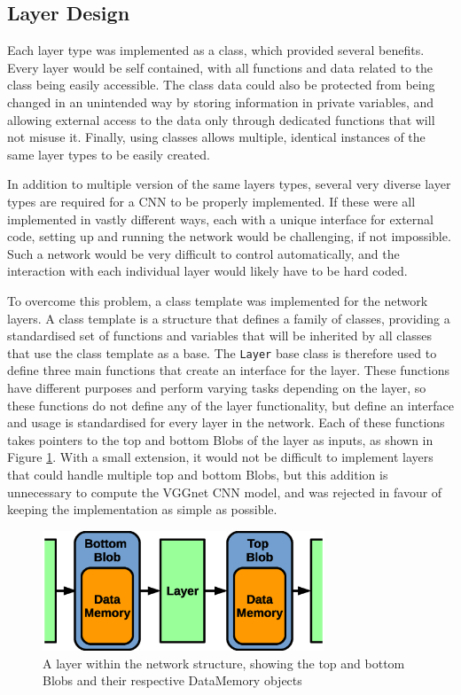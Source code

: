 \documentclass[12pt]{article}
\begin{document}
\subsection{Layer Design}
\label{sec:Design-Network-Layers}

Each layer type was implemented as a class, which provided several benefits. Every layer would be self contained, with all functions and data related to the class being easily accessible. The class data could also be protected from being changed in an unintended way by storing information in private variables, and allowing external access to the data only through dedicated functions that will not misuse it. Finally, using classes allows multiple, identical instances of the same layer types to be easily created.

In addition to multiple version of the same layers types, several very diverse layer types are required for a CNN to be properly implemented. If these were all implemented in vastly different ways, each with a unique interface for external code, setting up and running the network would be challenging, if not impossible. Such a network would be very difficult to control automatically, and the interaction with each individual layer would likely have to be hard coded. 

To overcome this problem, a class template was implemented for the network layers. A class template is a structure that defines a family of classes, providing a standardised set of functions and variables that will be inherited by all classes that use the class template as a base. The \lstinline|Layer| base class is therefore used to define three main functions that create an interface for the layer. These functions have different purposes and perform varying tasks depending on the layer, so these functions do not define any of the layer functionality, but define an interface and usage is standardised for every layer in the network. Each of these functions takes pointers to the top and bottom Blobs of the layer as inputs, as shown in Figure \ref{fig:layer}. With a small extension, it would not be difficult to implement layers that could handle multiple top and bottom Blobs, but this addition is unnecessary to compute the VGGnet CNN model, and was rejected in favour of keeping the implementation as simple as possible.

\begin{figure} [H]
\centering
\includegraphics[width=0.75\textwidth]{figures/layer.eps}
\caption{A layer within the network structure, showing the top and bottom Blobs and their respective DataMemory objects}
\label{fig:layer}
\end{figure}
\end{document}
